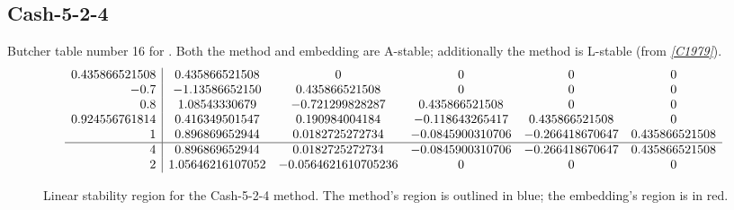 \documentclass[letterpaper,10pt,english]{sphinxmanual}
\begin{document}
\subsection{Cash-5-2-4}
\label{Butcher:butcher-cash-5-2-4}\label{Butcher:cash-5-2-4}
Butcher table number 16
for {\hyperref[c_interface/User_callable:c.ARKodeSetIRKTableNum]{\emph{}}}.  Both the
method and embedding are A-stable; additionally the method is L-stable
(from \label{Butcher:id15}{\hyperref[References:c1979]{\emph{{[}C1979{]}}}}).
\begin{gather}
\begin{split}\begin{array}{r|ccccc}
  0.435866521508 & 0.435866521508 & 0 & 0 & 0 & 0 \\
  -0.7 & -1.13586652150 & 0.435866521508 & 0 & 0 & 0 \\
  0.8 & 1.08543330679 & -0.721299828287 & 0.435866521508 & 0 & 0 \\
  0.924556761814 & 0.416349501547 & 0.190984004184 & -0.118643265417 & 0.435866521508 & 0 \\
  1 & 0.896869652944 & 0.0182725272734 & -0.0845900310706 & -0.266418670647 & 0.435866521508 \\
  \hline
  4 & 0.896869652944 & 0.0182725272734 & -0.0845900310706 & -0.266418670647 & 0.435866521508 \\
  2 & 1.05646216107052 & -0.0564621610705236 & 0 & 0 & 0
\end{array}\end{split}\notag
\end{gather}\begin{figure}[htbp]
\centering
\capstart

\caption{Linear stability region for the Cash-5-2-4 method.  The method's
region is outlined in blue; the embedding's region is in red.}\end{figure}
\end{document}
